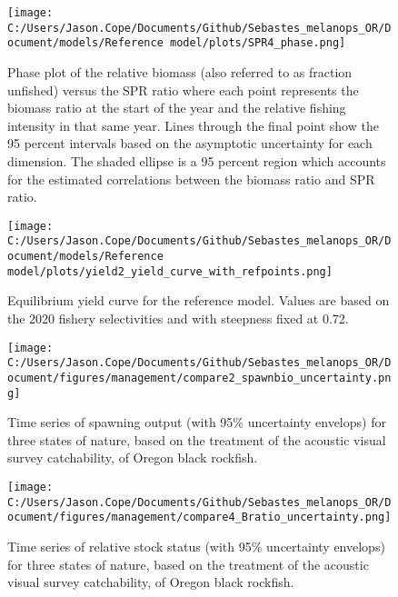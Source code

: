 \documentclass[11pt,
  letterpaper,
]{article}
\begin{document}
\clearpage

\begin{figure}
{\centering
\texttt{[image: C:/Users/Jason.Cope/Documents/Github/Sebastes\_melanops\_OR/Document/models/Reference model/plots/SPR4\_phase.png]}
}
\caption{Phase plot of the relative biomass (also referred to as fraction unfished) versus the SPR ratio where each point represents the biomass ratio at the start of the year and the relative fishing intensity in that same year. Lines through the final point show the 95 percent intervals based on the asymptotic uncertainty for each dimension. The shaded ellipse is a 95 percent region which accounts for the estimated correlations between the biomass ratio and SPR ratio.\label{fig:phase}}
\end{figure}

\newpage

\begin{figure}
{\centering
\texttt{[image: C:/Users/Jason.Cope/Documents/Github/Sebastes\_melanops\_OR/Document/models/Reference model/plots/yield2\_yield\_curve\_with\_refpoints.png]}
}
\caption{Equilibrium yield curve for the reference model. Values are based on the 2020
fishery selectivities and with steepness fixed at 0.72.\label{fig:yield}}
\end{figure}

\newpage

\begin{figure}
{\centering
\texttt{[image: C:/Users/Jason.Cope/Documents/Github/Sebastes\_melanops\_OR/Document/figures/management/compare2\_spawnbio\_uncertainty.png]}
}
\caption{Time series of spawning output (with 95\% uncertainty envelops) for three states of nature, based on the treatment of the acoustic visual survey catchability, of Oregon black rockfish.\label{fig:stateofnature_SO}}
\end{figure}

\begin{figure}
{\centering
\texttt{[image: C:/Users/Jason.Cope/Documents/Github/Sebastes\_melanops\_OR/Document/figures/management/compare4\_Bratio\_uncertainty.png]}
}
\caption{Time series of relative stock status (with 95\% uncertainty envelops) for three states of nature, based on the treatment of the acoustic visual survey catchability, of Oregon black rockfish.\label{fig:stateofnature_depl}}
\end{figure}
\end{document}
